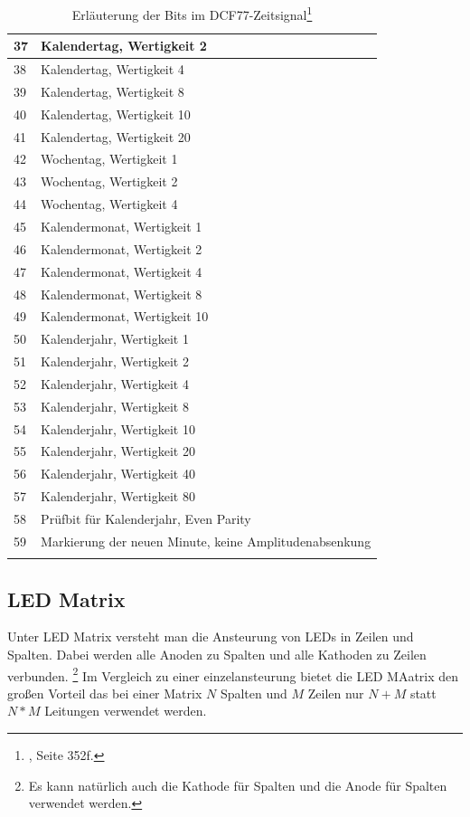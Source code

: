 \begin{longtable}{|l|l|}
37 & Kalendertag, Wertigkeit 2\\\hline
38 & Kalendertag, Wertigkeit 4\\\hline
39 & Kalendertag, Wertigkeit 8\\\hline
40 & Kalendertag, Wertigkeit 10\\\hline
41 & Kalendertag, Wertigkeit 20\\\hline
42 & Wochentag, Wertigkeit 1\\\hline
43 & Wochentag, Wertigkeit 2\\\hline
44 & Wochentag, Wertigkeit 4\\\hline
45 & Kalendermonat, Wertigkeit 1\\\hline
46 & Kalendermonat, Wertigkeit 2\\\hline
47 & Kalendermonat, Wertigkeit 4\\\hline
48 & Kalendermonat, Wertigkeit 8\\\hline
49 & Kalendermonat, Wertigkeit 10\\\hline
50 & Kalenderjahr, Wertigkeit 1\\\hline
51 & Kalenderjahr, Wertigkeit 2\\\hline
52 & Kalenderjahr, Wertigkeit 4\\\hline
53 & Kalenderjahr, Wertigkeit 8\\\hline
54 & Kalenderjahr, Wertigkeit 10\\\hline
55 & Kalenderjahr, Wertigkeit 20\\\hline
56 & Kalenderjahr, Wertigkeit 40\\\hline
57 & Kalenderjahr, Wertigkeit 80\\\hline
58 & Prüfbit für Kalenderjahr, Even Parity\\\hline
59 & Markierung der neuen Minute, keine Amplitudenabsenkung\\\hline
\caption{Erläuterung der Bits im DCF77-Zeitsignal\footnote{\cite{dcf77}, Seite 352f.}}\label{tbl_dcf77kod}
\end{longtable}
%
\subsection{LED Matrix}
Unter LED Matrix versteht man die Ansteurung von LEDs in Zeilen und Spalten. Dabei werden alle Anoden zu Spalten und alle Kathoden zu Zeilen
verbunden. \footnote{Es kann natürlich auch die Kathode für Spalten und die
Anode für Spalten verwendet werden.} Im Vergleich zu einer einzelansteurung
bietet die LED MAatrix den großen Vorteil das bei einer Matrix $N$ Spalten
und $M$ Zeilen nur $N+M$ statt $N*M$ Leitungen verwendet werden.

